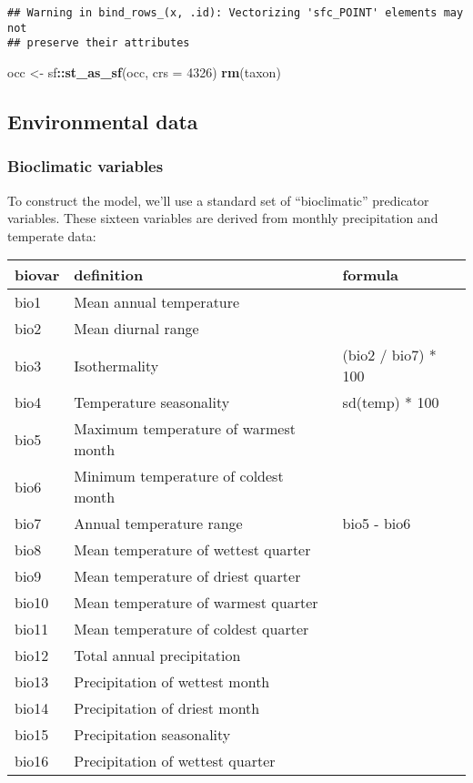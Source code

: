\documentclass[]{article}
\newenvironment{Shaded}{\begin{snugshade}}{\end{snugshade}}
\newcommand{\DataTypeTok}[1]{\textcolor[rgb]{0.13,0.29,0.53}{#1}}
\newcommand{\DecValTok}[1]{\textcolor[rgb]{0.00,0.00,0.81}{#1}}
\newcommand{\KeywordTok}[1]{\textcolor[rgb]{0.13,0.29,0.53}{\textbf{#1}}}
\newcommand{\NormalTok}[1]{#1}
\newcommand{\OperatorTok}[1]{\textcolor[rgb]{0.81,0.36,0.00}{\textbf{#1}}}
\newcommand{\StringTok}[1]{\textcolor[rgb]{0.31,0.60,0.02}{#1}}
\begin{document}
\begin{verbatim}
## Warning in bind_rows_(x, .id): Vectorizing 'sfc_POINT' elements may not
## preserve their attributes
\end{verbatim}

\begin{Shaded}
\begin{Highlighting}[]
\NormalTok{occ <-}\StringTok{ }\NormalTok{sf}\OperatorTok{::}\KeywordTok{st_as_sf}\NormalTok{(occ, }\DataTypeTok{crs =} \DecValTok{4326}\NormalTok{)}
\KeywordTok{rm}\NormalTok{(taxon)}
\end{Highlighting}
\end{Shaded}

\hypertarget{environmental-data}{%
\subsection{Environmental data}\label{environmental-data}}

\hypertarget{bioclimatic-variables}{%
\subsubsection{Bioclimatic variables}\label{bioclimatic-variables}}

To construct the model, we'll use a standard set of ``bioclimatic''
predicator variables. These sixteen variables are derived from monthly
precipitation and temperate data:

\captionsetup[table]{labelformat=empty,skip=1pt}
\begin{longtable}{lll}
\toprule
biovar & definition & formula \\ 
\midrule
bio1 & Mean annual temperature &  \\ 
bio2 & Mean diurnal range &  \\ 
bio3 & Isothermality & (bio2 / bio7) * 100 \\ 
bio4 & Temperature seasonality & sd(temp) * 100 \\ 
bio5 & Maximum temperature of warmest month &  \\ 
bio6 & Minimum temperature of coldest month &  \\ 
bio7 & Annual temperature range & bio5 - bio6 \\ 
bio8 & Mean temperature of wettest quarter &  \\ 
bio9 & Mean temperature of driest quarter &  \\ 
bio10 & Mean temperature of warmest quarter &  \\ 
bio11 & Mean temperature of coldest quarter &  \\ 
bio12 & Total annual precipitation &  \\ 
bio13 & Precipitation of wettest month &  \\ 
bio14 & Precipitation of driest month &  \\ 
bio15 & Precipitation seasonality &  \\ 
bio16 & Precipitation of wettest quarter &  \\ 
\bottomrule
\end{longtable}
\end{document}
